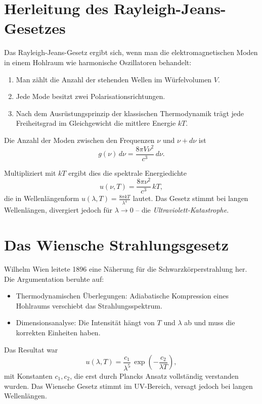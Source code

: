 \section{Herleitung des Rayleigh-Jeans-Gesetzes}
\label{anhangA:rayleigh}

Das Rayleigh-Jeans-Gesetz ergibt sich, wenn man die elektromagnetischen
Moden in einem Hohlraum wie harmonische Oszillatoren behandelt:

\begin{enumerate}
	\item Man zählt die Anzahl der stehenden Wellen im Würfelvolumen $V$.
	\item Jede Mode besitzt zwei Polarisationsrichtungen.
	\item Nach dem Ausrüstungsprinzip der klassischen Thermodynamik trägt
	jede Freiheitsgrad im Gleichgewicht die mittlere Energie $kT$.
\end{enumerate}

Die Anzahl der Moden zwischen den Frequenzen $\nu$ und $\nu + d\nu$ ist
\[
g(\nu)\, d\nu = \frac{8\pi V \nu^2}{c^3}\, d\nu.
\]

Multipliziert mit $kT$ ergibt dies die spektrale Energiedichte
\[
u(\nu, T) = \frac{8\pi \nu^2}{c^3}\, kT,
\]
die in Wellenlängenform $u(\lambda, T) = \tfrac{8\pi kT}{\lambda^4}$ lautet.
Das Gesetz stimmt bei langen Wellenlängen, divergiert jedoch für
$\lambda \to 0$ – die \emph{Ultraviolett-Katastrophe}.

\section{Das Wiensche Strahlungsgesetz}
\label{anhangA:wien}

Wilhelm Wien leitete 1896 eine Näherung für die Schwarzkörperstrahlung her.
Die Argumentation beruhte auf:

\begin{itemize}
	\item Thermodynamischen Überlegungen: Adiabatische Kompression eines
	Hohlraums verschiebt das Strahlungsspektrum.
	\item Dimensionsanalyse: Die Intensität hängt von $T$ und $\lambda$ ab
	und muss die korrekten Einheiten haben.
\end{itemize}

Das Resultat war
\[
u(\lambda, T) = \frac{c_1}{\lambda^5}\,
\exp\!\left(-\frac{c_2}{\lambda T}\right),
\]
mit Konstanten $c_1, c_2$, die erst durch Plancks Ansatz vollständig
verstanden wurden. Das Wiensche Gesetz stimmt im UV-Bereich,
versagt jedoch bei langen Wellenlängen.

